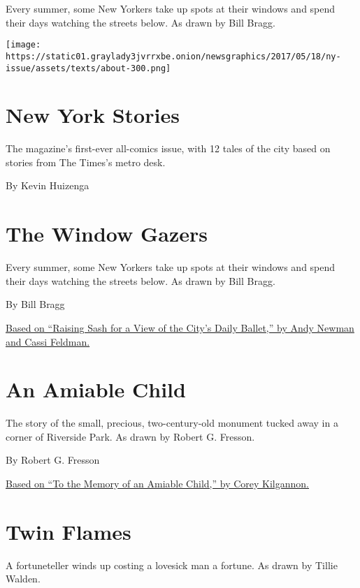 Every summer, some New Yorkers take up spots at their windows and spend
their days watching the streets below. As drawn by Bill Bragg.

\texttt{[image: https://static01.graylady3jvrrxbe.onion/newsgraphics/2017/05/18/ny-issue/assets/texts/about-300.png]}

\hypertarget{new-york-stories}{%
\section{New York Stories}\label{new-york-stories}}

The magazine's first-ever all-comics issue, with 12 tales of the city
based on stories from The Times's metro desk.

By Kevin Huizenga

\hypertarget{the-window-gazers-1}{%
\section{The Window Gazers}\label{the-window-gazers-1}}

Every summer, some New Yorkers take up spots at their windows and spend
their days watching the streets below. As drawn by Bill Bragg.

By Bill Bragg

\href{http://www.nytimes3xbfgragh.onion/2007/08/18/nyregion/18summer.html}{Based
on ``Raising Sash for a View of the City's Daily Ballet,'' by Andy
Newman and Cassi Feldman.}

\hypertarget{an-amiable-child}{%
\section{An Amiable Child}\label{an-amiable-child}}

The story of the small, precious, two-century-old monument tucked away
in a corner of Riverside Park. As drawn by Robert G. Fresson.

By Robert G. Fresson

\href{https://cityroom.blogs.nytimes3xbfgragh.onion/2008/08/12/to-the-memory-of-an-amiable-child/comment-page-1/}{Based
on ``To the Memory of an Amiable Child,'' by Corey Kilgannon.}

\hypertarget{twin-flames}{%
\section{Twin Flames}\label{twin-flames}}

A fortuneteller winds up costing a lovesick man a fortune. As drawn by
Tillie Walden.

